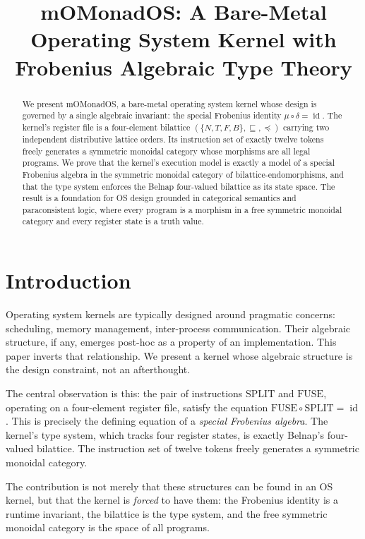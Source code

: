 \documentclass[11pt,a4paper]{article}
\title{mOMonadOS: A Bare-Metal Operating System Kernel with Frobenius Algebraic Type Theory}
\author{}
\date{}
\theoremstyle{definition}
\newcommand{\id}{\operatorname{id}}
\begin{document}
\maketitle

\begin{abstract}
We present mOMonadOS, a bare-metal operating system kernel whose design is governed by a single algebraic invariant: the special Frobenius identity $\mu \circ \delta = \id$. The kernel's register file is a four-element bilattice $(\{N,T,F,B\}, \sqsubseteq, \preceq)$ carrying two independent distributive lattice orders. Its instruction set of exactly twelve tokens freely generates a symmetric monoidal category whose morphisms are all legal programs. We prove that the kernel's execution model is exactly a model of a special Frobenius algebra in the symmetric monoidal category of bilattice-endomorphisms, and that the type system enforces the Belnap four-valued bilattice as its state space. The result is a foundation for OS design grounded in categorical semantics and paraconsistent logic, where every program is a morphism in a free symmetric monoidal category and every register state is a truth value.
\end{abstract}

\section{Introduction}

Operating system kernels are typically designed around pragmatic concerns: scheduling, memory management, inter-process communication. Their algebraic structure, if any, emerges post-hoc as a property of an implementation. This paper inverts that relationship. We present a kernel whose algebraic structure is the design constraint, not an afterthought.

The central observation is this: the pair of instructions $\text{SPLIT}$ and $\text{FUSE}$, operating on a four-element register file, satisfy the equation $\text{FUSE} \circ \text{SPLIT} = \id$. This is precisely the defining equation of a \emph{special Frobenius algebra}. The kernel's type system, which tracks four register states, is exactly Belnap's four-valued bilattice. The instruction set of twelve tokens freely generates a symmetric monoidal category.

The contribution is not merely that these structures can be found in an OS kernel, but that the kernel is \emph{forced} to have them: the Frobenius identity is a runtime invariant, the bilattice is the type system, and the free symmetric monoidal category is the space of all programs.
\end{document}
